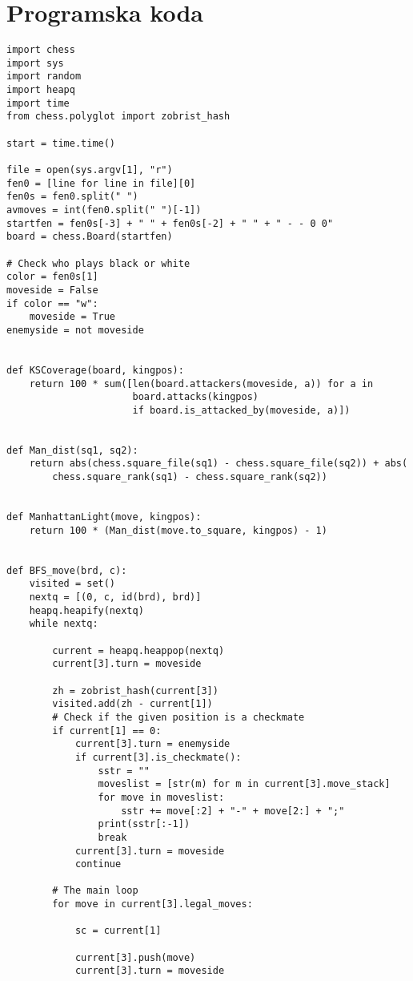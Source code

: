 \documentclass[runningheads]{llncs}
\begin{document}
\section{Programska koda}
\begin{lstlisting}
import chess
import sys
import random
import heapq
import time
from chess.polyglot import zobrist_hash

start = time.time()

file = open(sys.argv[1], "r")
fen0 = [line for line in file][0]
fen0s = fen0.split(" ")
avmoves = int(fen0.split(" ")[-1])
startfen = fen0s[-3] + " " + fen0s[-2] + " " + " - - 0 0"
board = chess.Board(startfen)

# Check who plays black or white
color = fen0s[1]
moveside = False
if color == "w":
    moveside = True
enemyside = not moveside


def KSCoverage(board, kingpos):
    return 100 * sum([len(board.attackers(moveside, a)) for a in
                      board.attacks(kingpos)
                      if board.is_attacked_by(moveside, a)])


def Man_dist(sq1, sq2):
    return abs(chess.square_file(sq1) - chess.square_file(sq2)) + abs(
        chess.square_rank(sq1) - chess.square_rank(sq2))


def ManhattanLight(move, kingpos):
    return 100 * (Man_dist(move.to_square, kingpos) - 1)


def BFS_move(brd, c):
    visited = set()
    nextq = [(0, c, id(brd), brd)]
    heapq.heapify(nextq)
    while nextq:

        current = heapq.heappop(nextq)
        current[3].turn = moveside

        zh = zobrist_hash(current[3])
        visited.add(zh - current[1])
        # Check if the given position is a checkmate
        if current[1] == 0:
            current[3].turn = enemyside
            if current[3].is_checkmate():
                sstr = ""
                moveslist = [str(m) for m in current[3].move_stack]
                for move in moveslist:
                    sstr += move[:2] + "-" + move[2:] + ";"
                print(sstr[:-1])
                break
            current[3].turn = moveside
            continue

        # The main loop
        for move in current[3].legal_moves:

            sc = current[1]

            current[3].push(move)
            current[3].turn = moveside


\end{lstlisting}
\end{document}
